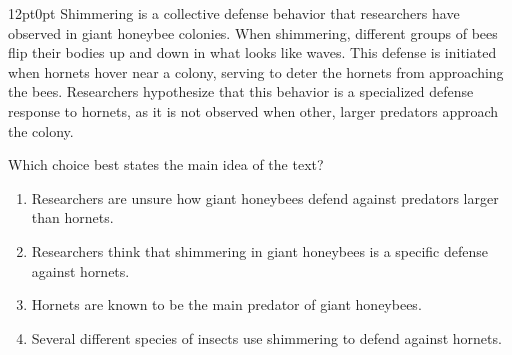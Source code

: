 \documentclass[11pt, twocolumn]{article}
\newcounter{questionnum}
\begin{document}
\vspace{6pt}\noindent
\begin{minipage}{\columnwidth}\raggedright
\noindent{}\par\vspace{8pt}
\begin{adjustwidth}{12pt}{0pt}
Shimmering is a collective defense behavior that researchers have observed in giant honeybee colonies. When shimmering, different groups of bees flip their bodies up and down in what looks like waves. This defense is initiated when hornets hover near a colony, serving to deter the hornets from approaching the bees. Researchers hypothesize that this behavior is a specialized defense response to hornets, as it is not observed when other, larger predators approach the colony.
\vspace{6pt}

Which choice best states the main idea of the text?
\begin{enumerate}[label=\Alph*),leftmargin=18pt,topsep=3pt,itemsep=2pt]
  \item Researchers are unsure how giant honeybees defend against predators larger than hornets.
  \item Researchers think that shimmering in giant honeybees is a specific defense against hornets.
  \item Hornets are known to be the main predator of giant honeybees.
  \item Several different species of insects use shimmering to defend against hornets.
\end{enumerate}
\end{adjustwidth}
\end{minipage}\par
\end{document}

